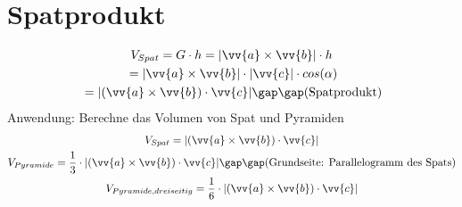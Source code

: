 \section{Spatprodukt}
\begin{gather*}
  V_{Spat} = G \cdot h = |\vv{a} \times \vv{b}| \cdot h \\
  \;= |\vv{a} \times \vv{b}| \cdot |\vv{c}| \cdot cos(\alpha) \\
  \;= |(\vv{a} \times \vv{b}) \cdot \vv{c}| \gap\gap \text{(Spatprodukt)}
\end{gather*}
Anwendung: Berechne das Volumen von Spat und Pyramiden
\begin{gather*}
  V_{Spat} = |(\vv{a} \times \vv{b}) \cdot \vv{c}| \\
  V_{Pyramide} = \frac{1}{3} \cdot |(\vv{a} \times \vv{b}) \cdot \vv{c}| \gap\gap \text{(Grundseite: Parallelogramm des Spats)} \\
  V_{Pyramide,dreiseitig} = \frac{1}{6} \cdot |(\vv{a} \times \vv{b}) \cdot \vv{c}|
\end{gather*}
